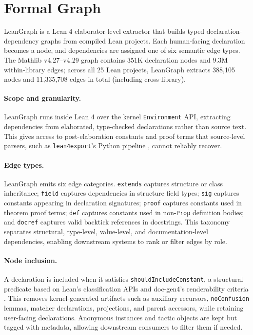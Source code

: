 \section{Formal Graph}

LeanGraph is a Lean 4 elaborator-level extractor that builds typed declaration-dependency graphs from compiled Lean projects. Each human-facing declaration becomes a node, and dependencies are assigned one of six semantic edge types. The Mathlib v4.27--v4.29 graph contains 351K declaration nodes and 9.3M within-library edges; across all 25 Lean projects, LeanGraph extracts 388,105 nodes and 11,335,708 edges in total (including cross-library).

\paragraph{Scope and granularity.}
LeanGraph runs inside Lean 4 over the kernel \texttt{Environment} API, extracting dependencies from elaborated, type-checked declarations rather than source text. This gives access to post-elaboration constants and proof terms that source-level parsers, such as \texttt{lean4export}'s Python pipeline \cite{lean4export}, cannot reliably recover.

\paragraph{Edge types.}

LeanGraph emits six edge categories. \texttt{extends} captures structure or class inheritance; \texttt{field} captures dependencies in structure field types; \texttt{sig} captures constants appearing in declaration signatures; \texttt{proof} captures constants used in theorem proof terms; \texttt{def} captures constants used in non-\texttt{Prop} definition bodies; and \texttt{docref} captures valid backtick references in docstrings. This taxonomy separates structural, type-level, value-level, and documentation-level dependencies, enabling downstream systems to rank or filter edges by role.

\paragraph{Node inclusion.}
A declaration is included when it satisfies \texttt{shouldIncludeConstant}, a structural predicate based on Lean's classification APIs and doc-gen4's renderability criteria \cite{docgen4}. This removes kernel-generated artifacts such as auxiliary recursors, \texttt{noConfusion} lemmas, matcher declarations, projections, and parent accessors, while retaining user-facing declarations. Anonymous instances and tactic objects are kept but tagged with metadata, allowing downstream consumers to filter them if needed.